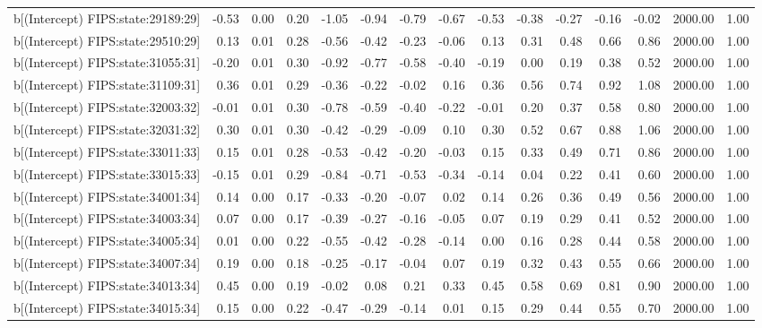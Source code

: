 \begin{table}[ht]
\begin{tabular}{rrrrrrrrrrrrrrr}
  b[(Intercept) FIPS:state:29189:29] & -0.53 & 0.00 & 0.20 & -1.05 & -0.94 & -0.79 & -0.67 & -0.53 & -0.38 & -0.27 & -0.16 & -0.02 & 2000.00 & 1.00 \\ 
  b[(Intercept) FIPS:state:29510:29] & 0.13 & 0.01 & 0.28 & -0.56 & -0.42 & -0.23 & -0.06 & 0.13 & 0.31 & 0.48 & 0.66 & 0.86 & 2000.00 & 1.00 \\ 
  b[(Intercept) FIPS:state:31055:31] & -0.20 & 0.01 & 0.30 & -0.92 & -0.77 & -0.58 & -0.40 & -0.19 & 0.00 & 0.19 & 0.38 & 0.52 & 2000.00 & 1.00 \\ 
  b[(Intercept) FIPS:state:31109:31] & 0.36 & 0.01 & 0.29 & -0.36 & -0.22 & -0.02 & 0.16 & 0.36 & 0.56 & 0.74 & 0.92 & 1.08 & 2000.00 & 1.00 \\ 
  b[(Intercept) FIPS:state:32003:32] & -0.01 & 0.01 & 0.30 & -0.78 & -0.59 & -0.40 & -0.22 & -0.01 & 0.20 & 0.37 & 0.58 & 0.80 & 2000.00 & 1.00 \\ 
  b[(Intercept) FIPS:state:32031:32] & 0.30 & 0.01 & 0.30 & -0.42 & -0.29 & -0.09 & 0.10 & 0.30 & 0.52 & 0.67 & 0.88 & 1.06 & 2000.00 & 1.00 \\ 
  b[(Intercept) FIPS:state:33011:33] & 0.15 & 0.01 & 0.28 & -0.53 & -0.42 & -0.20 & -0.03 & 0.15 & 0.33 & 0.49 & 0.71 & 0.86 & 2000.00 & 1.00 \\ 
  b[(Intercept) FIPS:state:33015:33] & -0.15 & 0.01 & 0.29 & -0.84 & -0.71 & -0.53 & -0.34 & -0.14 & 0.04 & 0.22 & 0.41 & 0.60 & 2000.00 & 1.00 \\ 
  b[(Intercept) FIPS:state:34001:34] & 0.14 & 0.00 & 0.17 & -0.33 & -0.20 & -0.07 & 0.02 & 0.14 & 0.26 & 0.36 & 0.49 & 0.56 & 2000.00 & 1.00 \\ 
  b[(Intercept) FIPS:state:34003:34] & 0.07 & 0.00 & 0.17 & -0.39 & -0.27 & -0.16 & -0.05 & 0.07 & 0.19 & 0.29 & 0.41 & 0.52 & 2000.00 & 1.00 \\ 
  b[(Intercept) FIPS:state:34005:34] & 0.01 & 0.00 & 0.22 & -0.55 & -0.42 & -0.28 & -0.14 & 0.00 & 0.16 & 0.28 & 0.44 & 0.58 & 2000.00 & 1.00 \\ 
  b[(Intercept) FIPS:state:34007:34] & 0.19 & 0.00 & 0.18 & -0.25 & -0.17 & -0.04 & 0.07 & 0.19 & 0.32 & 0.43 & 0.55 & 0.66 & 2000.00 & 1.00 \\ 
  b[(Intercept) FIPS:state:34013:34] & 0.45 & 0.00 & 0.19 & -0.02 & 0.08 & 0.21 & 0.33 & 0.45 & 0.58 & 0.69 & 0.81 & 0.90 & 2000.00 & 1.00 \\ 
  b[(Intercept) FIPS:state:34015:34] & 0.15 & 0.00 & 0.22 & -0.47 & -0.29 & -0.14 & 0.01 & 0.15 & 0.29 & 0.44 & 0.55 & 0.70 & 2000.00 & 1.00 \\ 

\end{tabular}
\end{table}
